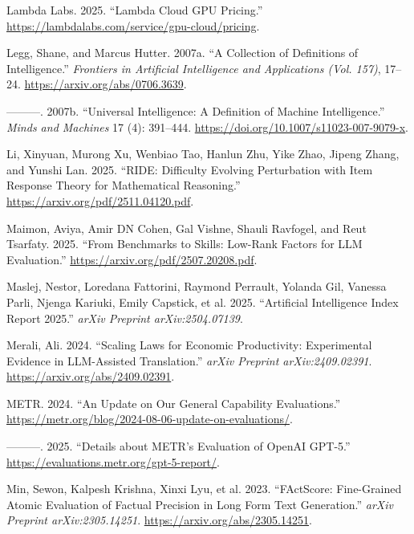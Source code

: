 \documentclass[
  letterpaper,
  DIV=11,
  numbers=noendperiod,
  oneside]{scrartcl}
\newlength{\cslhangindent}
\newenvironment{CSLReferences}[2] %
 {\begin{list}{}{%
  \setlength{\itemindent}{0pt}
  \setlength{\leftmargin}{0pt}
  \setlength{\parsep}{0pt}
  \ifodd #1
   \setlength{\leftmargin}{\cslhangindent}
   \setlength{\itemindent}{-1\cslhangindent}
  \fi
  \setlength{\itemsep}{#2\baselineskip}}}
 {\end{list}}
\begin{document}
\begin{CSLReferences}{1}{0}
Lambda Labs. 2025. {``Lambda Cloud GPU Pricing.''}
\url{https://lambdalabs.com/service/gpu-cloud/pricing}.

Legg, Shane, and Marcus Hutter. 2007a. {``A Collection of Definitions of
Intelligence.''} \emph{Frontiers in Artificial Intelligence and
Applications (Vol. 157)}, 17--24. \url{https://arxiv.org/abs/0706.3639}.

---------. 2007b. {``Universal Intelligence: A Definition of Machine
Intelligence.''} \emph{Minds and Machines} 17 (4): 391--444.
\url{https://doi.org/10.1007/s11023-007-9079-x}.

Li, Xinyuan, Murong Xu, Wenbiao Tao, Hanlun Zhu, Yike Zhao, Jipeng
Zhang, and Yunshi Lan. 2025. {``RIDE: Difficulty Evolving Perturbation
with Item Response Theory for Mathematical Reasoning.''}
\url{https://arxiv.org/pdf/2511.04120.pdf}.

Maimon, Aviya, Amir DN Cohen, Gal Vishne, Shauli Ravfogel, and Reut
Tsarfaty. 2025. {``From Benchmarks to Skills: Low-Rank Factors for LLM
Evaluation.''} \url{https://arxiv.org/pdf/2507.20208.pdf}.

Maslej, Nestor, Loredana Fattorini, Raymond Perrault, Yolanda Gil,
Vanessa Parli, Njenga Kariuki, Emily Capstick, et al. 2025.
{``Artificial Intelligence Index Report 2025.''} \emph{arXiv Preprint
arXiv:2504.07139}.

Merali, Ali. 2024. {``Scaling Laws for Economic Productivity:
Experimental Evidence in LLM-Assisted Translation.''} \emph{arXiv
Preprint arXiv:2409.02391}. \url{https://arxiv.org/abs/2409.02391}.

METR. 2024. {``An Update on Our General Capability Evaluations.''}
\url{https://metr.org/blog/2024-08-06-update-on-evaluations/}.

---------. 2025. {``Details about METR's Evaluation of OpenAI GPT-5.''}
\url{https://evaluations.metr.org/gpt-5-report/}.

Min, Sewon, Kalpesh Krishna, Xinxi Lyu, et al. 2023. {``FActScore:
Fine-Grained Atomic Evaluation of Factual Precision in Long Form Text
Generation.''} \emph{arXiv Preprint arXiv:2305.14251}.
\url{https://arxiv.org/abs/2305.14251}.


\end{CSLReferences}
\end{document}
